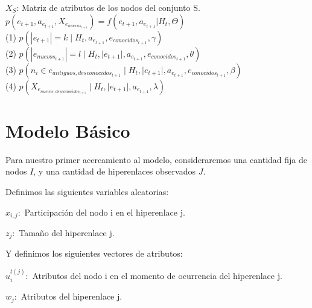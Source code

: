 $X_{S}$: Matriz de atributos de los nodos del conjunto S.\\

$p(e_{t+1}, a_{e_{t+1}}, X_{e_{nuevos_{t+1}}}   ) = f(e_{t+1}, a_{e_{t+1}}|H_{t}, \Theta)$\\

(1) $p(|e_{t+1}| = k \;|\; H_{t}, a_{e_{t+1}}, e_{conocidos_{t+1}}, \gamma)$\\

(2) $p(|e_{nuevos_{t+1}}| = l \;|\; H_{t}, |e_{t+1}|, a_{e_{t+1}}, e_{conocidos_{t+1}}, \theta)$\\

(3) $p(n_{i} \in e_{antiguos,desconocidos_{t+1}} \;|\; H_{t}, |e_{t+1}|, a_{e_{t+1}}, e_{conocidos_{t+1}}, \beta)$\\

(4) $p(X_{e_{nuevos,desconocidos_{t+1}}} \;|\; H_{t}, |e_{t+1}|, a_{e_{t+1}}, \lambda)$\\







\section{Modelo Básico}

Para nuestro primer acercamiento al modelo, consideraremos una cantidad fija de nodos $I$, y una cantidad de hiperenlaces observados $J$.

Definimos las siguientes variables aleatorias:

\begin{center}
    $x_{i,j}:$ Participación del nodo i en el hiperenlace j.
\end{center}

\begin{center}
    $z_{j}:$ Tamaño del hiperenlace j.
\end{center}


Y definimos los siguientes vectores de atributos:\\

\begin{center}
    $u_{i}^{t(j)}:$ Atributos del nodo i en el momento de ocurrencia del hiperenlace j.
\end{center}

\begin{center}
    $w_{j}:$ Atributos del hiperenlace j.
\end{center}

